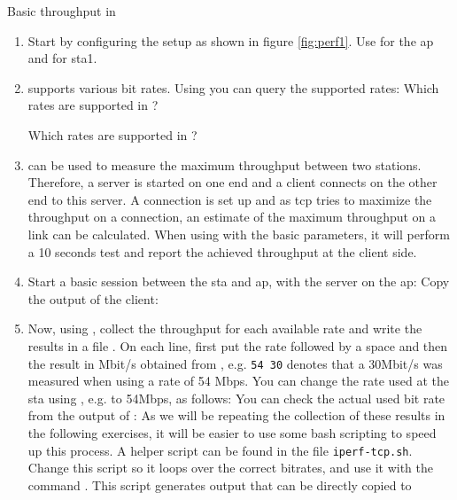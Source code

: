 \begin{exercise}{Basic throughput in }
	\begin{enumerate}
		\item Start by configuring the setup as shown in figure \ref{fig:perf1}. Use  for the \ac{ap} and  for \ac{sta}1.
		\item \label{item:rates}\wifi supports various bit rates. Using  you can query the supported rates:\newline
		Which rates are supported in ?\newline
		\begin{esolution}
		\end{esolution}
		Which rates are supported in ?\newline
		\begin{esolution}
		\end{esolution}
		\item {} can be used to measure the maximum throughput between two stations. Therefore, a server is started on one end and a client connects on the other end to this server. A connection is set up and as \ac{tcp} tries to maximize the throughput on a connection, an estimate of the maximum throughput on a link can be calculated. When using  with the basic parameters, it will perform a 10 seconds test and report the achieved throughput at the client side.
		\item Start a basic  session between the \ac{sta} and \ac{ap}, with the  server on the \ac{ap}: \newline
		Copy the output of the  client:\newline
		\begin{esolution}
		\end{esolution}
	
		\item Now, using , collect the throughput for each available rate and write the results in a file . On each line, first put the rate followed by a space and then the result in Mbit/s obtained from , e.g. \texttt{54 30} denotes that a 30Mbit/s was measured when using a rate of 54 Mbps. You can change the rate used at the \ac{sta} using , e.g. to 54Mbps, as follows:\newline
		You can check the actual used bit rate from the output of :\newline
		\remark As we will be repeating the collection of these results in the following exercises, it will be easier to use some bash scripting to speed up this process. 
		A helper script can be found in the file \texttt{iperf-tcp.sh}. Change this script so it loops over the correct bitrates, and use it with the command .\newline
		This script generates output that can be directly copied to 
		

\end{enumerate}
\end{exercise}
